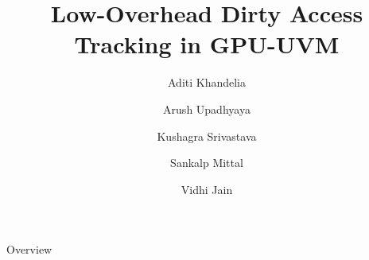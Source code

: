 \documentclass[aspectratio=169,xcolor=dvipsnames]{beamer}
\title{Low-Overhead Dirty Access Tracking in GPU-UVM}
\author{Aditi Khandelia \and Arush Upadhyaya \and Kushagra Srivastava \and Sankalp Mittal \and Vidhi Jain}
\date{}
\institute
{
    \parbox{\textwidth}{\centering
    CS614 : Linux Kernel Programming \\
    Department of Computer Science and Engineering \\
    Indian Institute of Technology Kanpur}
}
\begin{document}
\begin{frame}
    \titlepage
\end{frame}

\begin{frame}{Overview}
    \tableofcontents
\end{frame}






\end{document}
